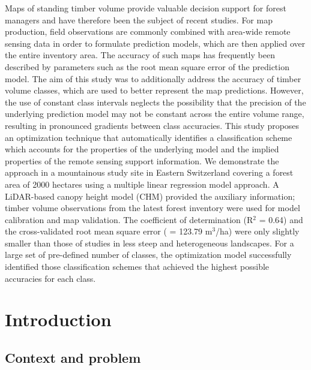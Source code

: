 Maps of standing timber volume provide valuable decision support for forest managers and have therefore been the subject of recent studies. For map production, field observations are commonly combined with area-wide remote sensing data in order to formulate prediction models, which are then applied over the entire inventory area. The accuracy of such maps has frequently been described by parameters such as the root mean square error of the prediction model. The aim of this study was to additionally address the accuracy of timber volume classes, which are used to better represent the map predictions. However, the use of constant class intervals neglects the possibility that the precision of the underlying prediction model may not be constant across the entire volume range, resulting in pronounced gradients between class accuracies. This study proposes an optimization technique that automatically identifies a classification scheme which accounts for the properties of the underlying model and the implied properties of the remote sensing support information. We demonstrate the approach in a mountainous study site in Eastern Switzerland covering a forest area of 2000 hectares using a multiple linear regression model approach. A LiDAR-based canopy height model (CHM) provided the auxiliary information; timber volume observations from the latest forest inventory were used for model calibration and map validation. The coefficient of determination (R$^2$ = 0.64) and the cross-validated root mean square error (\rmsecv{} = 123.79 m$^3$/ha) were only slightly smaller than those of studies in less steep and heterogeneous landscapes. For a large set of pre-defined number of classes, the optimization model successfully identified those classification schemes that achieved the highest possible accuracies for each class.



\section{Introduction} %
\label{sec:intro}

\subsection{Context and problem}
\label{sec:co_and_prob}

